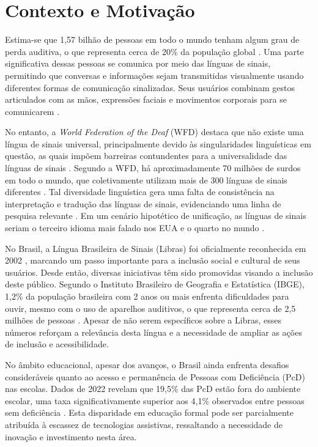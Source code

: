 \section{Contexto e Motivação}

Estima-se que 1,57 bilhão de pessoas em todo o mundo tenham algum grau de perda auditiva, o que representa cerca de 20\% da população global \cite{Forbes2023}. Uma parte significativa dessas pessoas se comunica por meio das línguas de sinais, permitindo que conversas e informações sejam transmitidas visualmente usando diferentes formas de comunicação sinalizadas. Seus usuários combinam gestos articulados com as mãos, expressões faciais e movimentos corporais para se comunicarem \cite{Duke2009, Quadros2019, Honora2017}.

No entanto, a \textit{World Federation of the Deaf} (WFD) destaca que não existe uma língua de sinais universal, principalmente devido às singularidades linguísticas em questão, as quais impõem barreiras contundentes para a universalidade das línguas de sinais \cite{ONU2023, Quadros2019}. Segundo a WFD, há aproximadamente 70 milhões de surdos em todo o mundo, que coletivamente utilizam mais de 300 línguas de sinais diferentes \cite{ONU2023}. Tal diversidade linguística gera uma falta de consistência na interpretação e tradução das línguas de sinais, evidenciando uma linha de pesquisa relevante \cite{Napier2019}. Em um cenário hipotético de unificação, as línguas de sinais seriam o terceiro idioma mais falado nos EUA e o quarto no mundo \cite{Duke2009}.

No Brasil, a Língua Brasileira de Sinais (Libras) foi oficialmente reconhecida em 2002 \cite{Quadros2019, Honora2017}, marcando um passo importante para a inclusão social e cultural de seus usuários. Desde então, diversas iniciativas têm sido promovidas visando a inclusão deste público. Segundo o Instituto Brasileiro de Geografia e Estatística (IBGE), 1,2\% da população brasileira com 2 anos ou mais enfrenta dificuldades para ouvir, mesmo com o uso de aparelhos auditivos, o que representa cerca de 2,5 milhões de pessoas \cite{IBGE2022}. Apesar de não serem específicos sobre a Libras, esses números reforçam a relevância desta língua e a necessidade de ampliar as ações de inclusão e acessibilidade.

No âmbito educacional, apesar dos avanços, o Brasil ainda enfrenta desafios consideráveis quanto ao acesso e permanência de Pessoas com Deficiência (PcD) nas escolas. Dados de 2022 revelam que 19,5\% das PcD estão fora do ambiente escolar, uma taxa significativamente superior aos 4,1\% observados entre pessoas sem deficiência \cite{IBGE2022}. Esta disparidade em educação formal pode ser parcialmente atribuída à escassez de tecnologias assistivas, ressaltando a necessidade de inovação e investimento nesta área.

